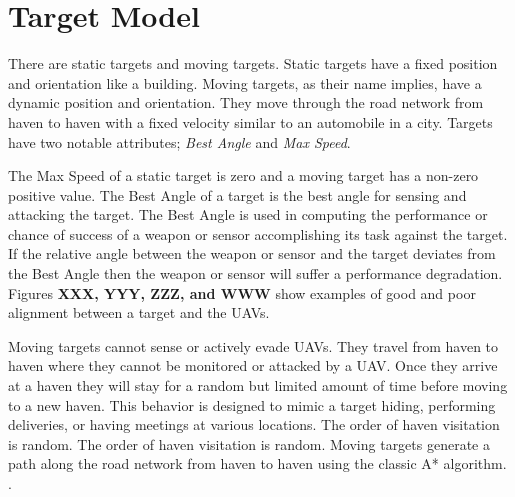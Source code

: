 \chapter{Target Model}
There are static targets and moving targets.  Static targets have a fixed position and orientation like a building.  Moving targets, as their name implies, have a dynamic position and orientation.  They move through the road network from haven to haven with a fixed velocity similar to an automobile in a city.  Targets have two notable attributes; \textit{Best Angle} and \textit{Max Speed}.

The Max Speed of a static target is zero and a moving target has a non-zero positive value.  The Best Angle of a target is the best angle for sensing and attacking the target.  The Best Angle is used in computing the performance or chance of success of a weapon or sensor accomplishing its task against the target.  If the relative angle between the weapon or sensor and the target deviates from the Best Angle then the weapon or sensor will suffer a performance degradation.  Figures \textbf{XXX, YYY, ZZZ, and WWW} show examples of good and poor alignment between a target and the UAVs.


Moving targets cannot sense or actively evade UAVs.  They travel from haven to haven where they cannot be monitored or attacked by a UAV.  Once they arrive at a haven they will stay for a random but limited amount of time before moving to a new haven.  This behavior is designed to mimic a target hiding, performing deliveries, or having meetings at various locations.  The order of haven visitation is random.  The order of haven visitation is random.  Moving targets generate a path along the road network from haven to haven using the classic A* algorithm. .

